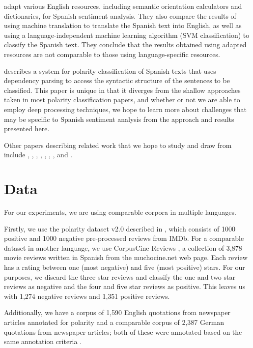 \documentclass[11pt]{article}
\begin{document}
 adapt various English resources, including semantic orientation calculators and dictionaries, for Spanish sentiment analysis.  They also compare the results of using machine translation to translate the Spanish text into English, as well as using a language-independent machine learning algorithm (SVM classification) to classify the Spanish text.  They conclude that the results obtained using adapted resources are not comparable to those using language-specific resources.

 describes a system for polarity classification of Spanish texts that uses dependency parsing to access the syntactic structure of the sentences to be classified.  This paper is unique in that it diverges from the shallow approaches taken in most polarity classification papers, and whether or not we are able to employ deep processing techniques, we hope to learn more about challenges that may be specific to Spanish sentiment analysis from the approach and results presented here.

Other papers describing related work that we hope to study and draw from include , , , , , , , and .

\section{Data}

For our experiments, we are using comparable corpora in multiple languages.

Firstly, we use the polarity dataset v2.0 described in , which consists of 1000 positive and 1000 negative pre-processed reviews from IMDb.  For a comparable dataset in another language, we use CorpusCine Reviews \cite{cruzmata2011}, a collection of 3,878 movie reviews written in Spanish from the muchocine.net web page.  Each review has a rating between one (most negative) and five (most positive) stars.  For our purposes, we discard the three star reviews and classify the one and two star reviews as negative and the four and five star reviews as positive.  This leaves us with 1,274 negative reviews and 1,351 positive reviews.

Additionally, we have a corpus of 1,590 English quotations from newspaper articles annotated for polarity and a comparable corpus of 2,387 German quotations from newspaper articles; both of these were annotated based on the same annotation criteria \cite{balahur2011}.
\end{document}
